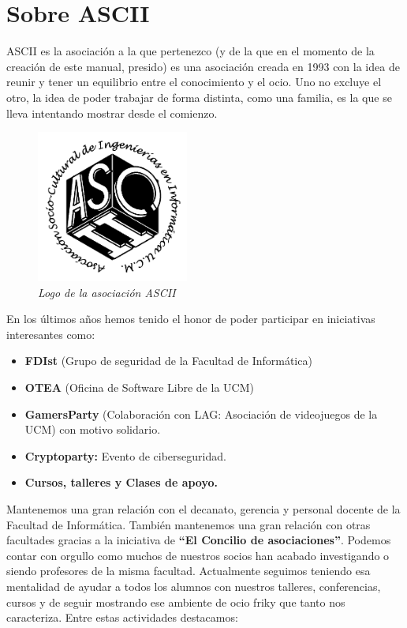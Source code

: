 \newpage
\chapter*{Sobre ASCII}
\noindent
\begin{multicols}{2}
\noindent
ASCII es la asociación a la que pertenezco (y de la que en el momento de la creación de este manual, presido) es una asociación creada en 1993 con la idea de reunir y tener un equilibrio entre el conocimiento y el ocio. Uno no excluye el otro, la idea de poder trabajar de forma distinta, como una familia, es la que se lleva intentando mostrar desde el comienzo.
\begin{figure}[H]
    \centering
    \includegraphics[width=5cm]{Images/logo_ASCII.png}
    \caption{\textit{Logo de la asociación ASCII}}
\end{figure}
\noindent
En los últimos años hemos tenido el honor de poder participar en iniciativas interesantes como:
\begin{itemize}
    \item \textbf{FDIst} (Grupo de seguridad de la Facultad de Informática)
    \item \textbf{OTEA} (Oficina de Software Libre de la UCM)
    \item \textbf{GamersParty} (Colaboración con LAG: Asociación de videojuegos de la UCM) con motivo solidario.
    \item \textbf{Cryptoparty:} Evento de ciberseguridad.
    \item \textbf{Cursos, talleres y Clases de apoyo.}
\end{itemize}
\noindent
Mantenemos una gran relación con el decanato, gerencia y personal docente de la Facultad de Informática. También mantenemos una gran relación con otras facultades gracias a la iniciativa de \textbf{``El Concilio de asociaciones''}. Podemos contar con orgullo como muchos de nuestros socios han acabado investigando o siendo profesores de la misma facultad. Actualmente seguimos teniendo esa mentalidad de ayudar a todos los alumnos con nuestros talleres, conferencias, cursos y de seguir mostrando ese ambiente de ocio friky que tanto nos caracteriza. Entre estas actividades destacamos:

\end{multicols}
